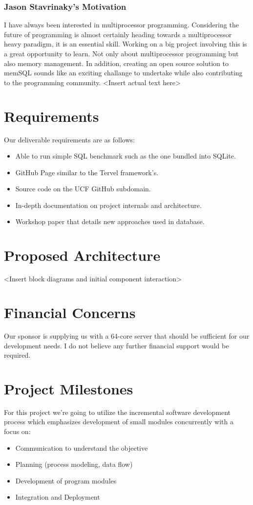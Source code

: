 \documentclass[letterpaper]{article}
\begin{document}
  \subsubsection{Jason Stavrinaky's Motivation}
  I have always been interested in multiprocessor programming. Considering the future of programming is almost certainly heading towards a
  multiprocessor heavy paradigm, it is an essential skill. Working on a big project involving this is a great opportunity to learn. Not only
  about multiprocessor programming but also memory management. In addition, creating an open source solution to memSQL sounds like an exciting
  challange to undertake while also contributing to the programming community.
  \textless Insert actual text here\textgreater
  
  \section{Requirements}
  Our deliverable requirements are as follows:
  \begin{itemize}
   \item Able to run simple SQL benchmark such as the one bundled into SQLite.
   \item GitHub Page similar to the Tervel framework's.
   \item Source code on the UCF GitHub subdomain.
   \item In-depth documentation on project internals and architecture.
   \item Workshop paper that details new approaches used in database.
  \end{itemize}
  
  \section{Proposed Architecture}
  \textless Insert block diagrams and initial component interaction\textgreater
  
  \section{Financial Concerns}
  Our sponsor is supplying us with a 64-core server that should be sufficient for our development needs. I do not believe any further financial
  support would be required.
  
  \section{Project Milestones}
  For this project we're going to utilize the incremental software development process which emphasizes development of small modules concurrently
  with a focus on:
  \begin{itemize}
   \item Communication to understand the objective
   \item Planning (process modeling, data flow)
   \item Development of program modules
   \item Integration and Deployment
  \end{itemize}
\end{document}
